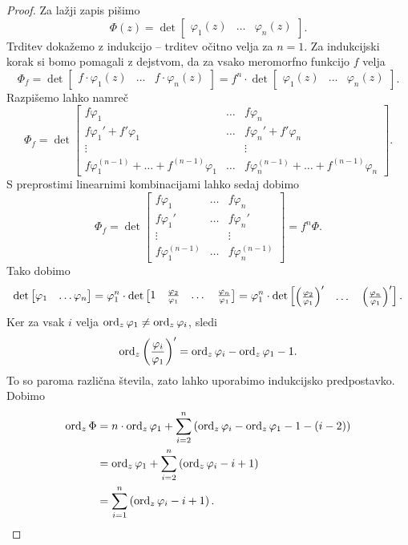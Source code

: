 \begin{proof}
Za lažji zapis pišimo
\[
\Phi(z) = \det
\begin{bmatrix}
\varphi_1(z) & \dots & \varphi_n(z)
\end{bmatrix}.
\]
Trditev dokažemo z indukcijo -- trditev očitno velja za $n=1$. Za
indukcijski korak si bomo pomagali z dejstvom, da za vsako
meromorfno funkcijo $f$ velja
\[
\Phi_f = \det
\begin{bmatrix}
f \cdot \varphi_1(z) & \dots & f \cdot \varphi_n(z)
\end{bmatrix}
=
f^n \cdot \det
\begin{bmatrix}
\varphi_1(z) & \dots & \varphi_n(z)
\end{bmatrix}.
\]
Razpišemo lahko namreč
\[
\Phi_f
=
\det
\begin{bmatrix}
f  \varphi_1 & \dots & f \varphi_n \\
f \varphi_1' + f' \varphi_1 & \dots & f \varphi_n' + f' \varphi_n \\
\vdots & & \vdots \\
f \varphi_1^{(n-1)} + \dots + f^{(n-1)} \varphi_1 & \dots & f \varphi_n^{(n-1)} + \dots + f^{(n-1)} \varphi_n
\end{bmatrix}.
\]
S preprostimi linearnimi kombinacijami lahko sedaj dobimo
\[
\Phi_f = \det
\begin{bmatrix}
f \varphi_1         & \dots & f \varphi_n         \\
f \varphi_1'        & \dots & f \varphi_n'        \\
\vdots              &       & \vdots              \\
f \varphi_1^{(n-1)} & \dots & f \varphi_n^{(n-1)}
\end{bmatrix}
= f^n \Phi.
\]
Tako dobimo
\[
\det
\begin{bmatrix}
\varphi_1 & \dots \varphi_n
\end{bmatrix}
=
\varphi_1^n \cdot \det
\begin{bmatrix}
1 & \frac{\varphi_2}{\varphi_1} &
\dots & \frac{\varphi_n}{\varphi_1}
\end{bmatrix}
=
\varphi_1^n \cdot \det
\begin{bmatrix}
\left(\frac{\varphi_2}{\varphi_1}\right)' & \dots &
\left(\frac{\varphi_n}{\varphi_1}\right)'
\end{bmatrix}.
\]
Ker za vsak $i$ velja $\operatorname{ord}_z \varphi_1 \ne \operatorname{ord}_z \varphi_i$,
sledi
\[
\operatorname{ord}_z \left(\frac{\varphi_i}{\varphi_1}\right)' =
\operatorname{ord}_z \varphi_i - \operatorname{ord}_z \varphi_1 - 1.
\]
To so paroma različna števila, zato lahko uporabimo indukcijsko
predpostavko. Dobimo
\begin{align*}
\operatorname{ord}_z \Phi &=
n \cdot \operatorname{ord}_z \varphi_1 +
\sum_{i=2}^n \left(\operatorname{ord}_z \varphi_i - \operatorname{ord}_z \varphi_1 - 1 - (i - 2)\right)
\\
&=
\operatorname{ord}_z \varphi_1 + \sum_{i=2}^n \left(\operatorname{ord}_z \varphi_i - i + 1\right)
\\
&=
\sum_{i=1}^n \left(\operatorname{ord}_z \varphi_i - i + 1\right). \qedhere
\end{align*}
\end{proof}

